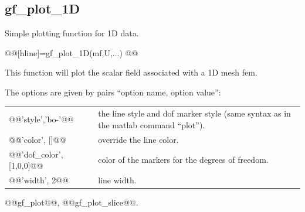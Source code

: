 \documentclass[11pt,a4paper]{article}
\newcommand{\hypertarget}[1]{\label{#1}}
\newcommand{\newpage}{}
\newcommand{\mf}{mesh fem\xspace}
\begin{document}
\subsection{gf\_plot_1D}
\begin{purpose}
\hypertarget{gfplot1d}
Simple plotting function for 1D data.
\end{purpose}
\begin{synopsis}
@@[hline]=gf_plot_1D(mf,U,...)
@@\end{synopsis}
\begin{cmddescription}
  This function will plot the scalar field associated with a 1D \mf.

  The options are given by pairs ``option name, option value'': 
\begin{center}
\begin{tabular}{|lp{}|}
  \hline
  @@'style','bo-'@@ &      the line style and dof marker style (same
  syntax as in the matlab command ``plot'').\\
  @@'color', []@@         & override the line color.\\
  @@'dof_color', [1,0,0]@@  & color of the markers for the degrees of freedom.\\
  @@'width', 2@@          & line width.\\
  \hline
\end{tabular}
\end{center}

\end{cmddescription}
\begin{gfseealso}
  @@gf\_plot@@, @@gf_plot_slice@@.
\end{gfseealso}
\newpage


\end{document}
